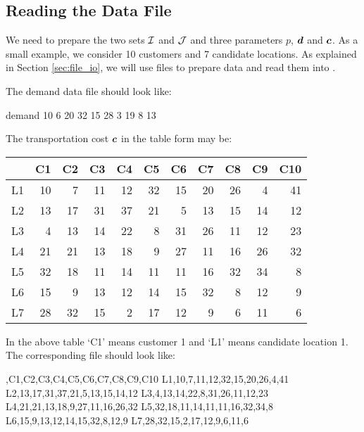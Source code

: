 \subsection{Reading the Data File}
We need to prepare the two sets $\mathcal{I}$ and $\mathcal{J}$ and three parameters $p$, $\boldsymbol{d}$ and $\boldsymbol{c}$. As a small example, we consider 10 customers and 7 candidate locations. As explained in Section \ref{sec:file_io}, we will use  files to prepare data and read them into \julia.

The demand data file  should look like:
\begin{code}
demand
10
6
20
32
15
28
3
19
8
13
\end{code}
The transportation cost $\boldsymbol{c}$ in the table form may be:

\begin{center}
\begin{tabular}{|r|r|r|r|r|r|r|r|r|r|r|}
\hline
    &    C1 & C2 & C3 & C4 & C5 &    C6 & C7 & C8 & C9 & C10  \\
\hline
L1  &    10 &  7 & 11 & 12 & 32 &    15 & 20 & 26 &  4 &  41  \\
L2  &    13 & 17 & 31 & 37 & 21 &     5 & 13 & 15 & 14 &  12  \\
L3  &     4 & 13 & 14 & 22 &  8 &    31 & 26 & 11 & 12 &  23  \\
L4  &    21 & 21 & 13 & 18 &  9 &    27 & 11 & 16 & 26 &  32  \\
L5  &    32 & 18 & 11 & 14 & 11 &    11 & 16 & 32 & 34 &   8  \\
L6  &    15 &  9 & 13 & 12 & 14 &    15 & 32 &  8 & 12 &   9  \\
L7  &    28 & 32 & 15 &  2 & 17 &    12 &  9 &  6 & 11 &   6  \\
\hline
\end{tabular}
\end{center}

In the above table `C1' means customer 1 and `L1' means candidate location 1. The corresponding  file should look like:
\begin{code}
,C1,C2,C3,C4,C5,C6,C7,C8,C9,C10
L1,10,7,11,12,32,15,20,26,4,41
L2,13,17,31,37,21,5,13,15,14,12
L3,4,13,14,22,8,31,26,11,12,23
L4,21,21,13,18,9,27,11,16,26,32
L5,32,18,11,14,11,11,16,32,34,8
L6,15,9,13,12,14,15,32,8,12,9
L7,28,32,15,2,17,12,9,6,11,6
\end{code}

